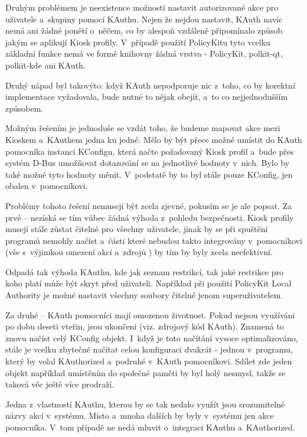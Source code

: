 Druhým problémem je neexistence možnosti nastavit autorizované akce pro uživatele a~skupiny pomocí KAuthu. Nejen že nejdou nastavit, KAuth navíc nemá ani žádné ponětí o~něčem, co by alespoň vzdáleně připomínalo způsob jakým se aplikují Kiosk profily. V~případě použití PolicyKitu tyto vcelku základní funkce nemá ve formě knihovny žádná vrstva - PolicyKit, polkit-qt, polkit-kde ani KAuth.

Druhý nápad byl takovýto: když KAuth nepodporuje nic z~toho, co by korektní implementace vyžadovala, bude nutné to nějak obejít, a~to co nejjednodušším způsobem.

Možným řešením je jednoduše se vzdát toho, že budeme mapovat akce mezi Kioskem a~KAuthem jedna ku jedné. Mělo by být přece možné umístit do KAuth pomocníka instanci KConfigu, která načte požadovaný Kiosk profil a~bude přes systém D-Bus umožňovat dotazování se na jednotlivé hodnoty v~nich. Bylo by také možné tyto hodnoty měnit. V~podstatě by to byl stále pouze KConfig, jen obalen v~pomocníkovi.

Problémy tohoto řešení nemusejí být zcela zjevné, pokusím se je ale popsat. Za prvé -- nezíská se tím vůbec žádná výhoda z~pohledu bezpečnosti. Kiosk profily musejí stále zůstat čitelné pro všechny uživatele, jinak by se při spuštění programů nemohly načíst a~části které nebudou takto integrovány v~pomocníkovi (vše s~výjimkou omezení akcí a~zdrojů ) by tím by byly zcela neefektivní.

Odpadá tak výhoda KAuthu, kde jak seznam restrikcí, tak jaké restrikce pro koho platí může být skryt před uživateli. Například při použití PolicyKit Local Authority je možné nastavit všechny soubory čitelné jenom superuživatelem.

Za druhé -- KAuth pomocníci mají omezenou životnost. Pokud nejsou využíváni po dobu deseti vteřin, jsou ukončeni (viz. zdrojový kód KAuth). Znamená to znovu načíst celý KConfig objekt. I~když je toto načítání vysoce optimalizováno, stále je vcelku zbytečné načítat celou konfiguraci dvakrát - jednou v~programu, který by volal KAuthorized a~podruhé v~KAuth pomocníkovi. Sdílet zde jeden objekt například umístěním do společné paměti by byl holý nesmysl, takže se taková věc ještě více prodraží.

Jedna z~vlastností KAuthu, kterou by se tak nedalo využít jsou srozumitelné názvy akcí v~systému. Místo  a~mnoha dalších by byly v~systému jen akce pomocníka. V~tom případě ne nedá mluvit o~integraci KAuthu a~KAuthorized.

